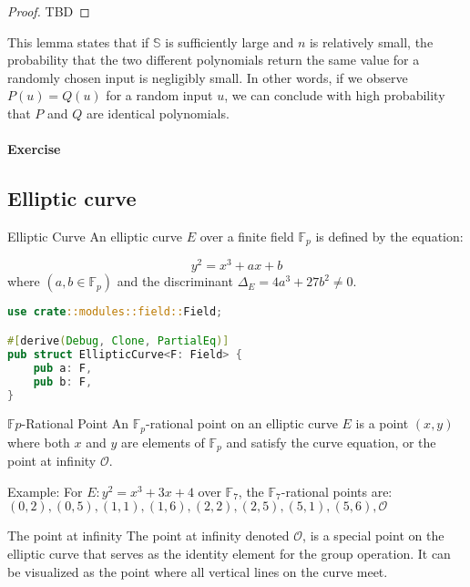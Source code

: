 \documentclass{article}
\begin{document}
\begin{proof}
    TBD
\end{proof}

This lemma states that if $\mathbb{S}$ is sufficiently large and $n$ is relatively small, the probability that the two different polynomials return the same value for a randomly chosen input is negligibly small. In other words, if we observe $P(u) = Q(u)$ for a random input $u$, we can conclude with high probability that $P$ and $Q$ are identical polynomials.

\paragraph{Exercise}

\subsection{Elliptic curve}

\begin{definition}{Elliptic Curve}{}
    An elliptic curve $E$ over a finite field $\mathbb{F}_{p}$ is defined by the equation:

    \begin{equation}
        y^2 = x^3 + a x + b
    \end{equation}
    where $(a, b \in \mathbb{F}_{p})$ and the discriminant $\Delta_{E} = 4a^3 + 27b^2 \neq 0$.
\end{definition}

\begin{lstlisting}[language=Rust, caption=Implementation of Elliptic Curve]
use crate::modules::field::Field;

#[derive(Debug, Clone, PartialEq)]
pub struct EllipticCurve<F: Field> {
    pub a: F,
    pub b: F,
}
\end{lstlisting}

\begin{definition}{$\mathbb{F}{p}$-Rational Point}{}
An $\mathbb{F}_{p}$-rational point on an elliptic curve $E$ is a point $(x, y)$ where both $x$ and $y$ are elements of $\mathbb{F}_{p}$ and satisfy the curve equation, or the point at infinity $\mathcal{O}$.
\end{definition}

Example: For $E: y^2 = x^3 + 3x + 4$ over $\mathbb{F}_{7}$, the $\mathbb{F}_{7}$-rational points are:
${(0, 2), (0, 5), (1, 1), (1, 6), (2, 2), (2, 5), (5, 1), (5, 6), \mathcal{O}}$

\begin{definition}{The point at infinity}{}
The point at infinity denoted $\mathcal{O}$, is a special point on the elliptic curve that serves as the identity element for the group operation. It can be visualized as the point where all vertical lines on the curve meet.
\end{definition}
\end{document}
